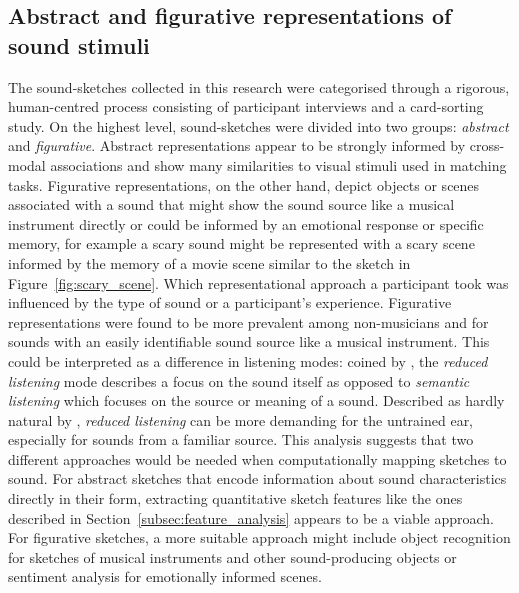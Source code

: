 \documentclass[]{interact}
\theoremstyle{plain}%
\theoremstyle{definition}
\theoremstyle{remark}
\begin{document}
\subsection{Abstract and figurative representations of sound stimuli}\label{subsec:disc_sketch_categorisation}
The sound-sketches collected in this research were categorised through a rigorous, human-centred process consisting of participant interviews and a card-sorting study. On the highest level, sound-sketches were divided into two groups: \textit{abstract} and \textit{figurative}. Abstract representations appear to be strongly informed by cross-modal associations and show many similarities to visual stimuli used in matching tasks. Figurative representations, on the other hand, depict objects or scenes associated with a sound that might show the sound source like a musical instrument directly or could be informed by an emotional response or specific memory, for example a scary sound might be represented with a scary scene informed by the memory of a movie scene similar to the sketch in Figure~\ref{fig:scary_scene}. Which representational approach a participant took was influenced by the type of sound or a participant's experience. Figurative representations were found to be more prevalent among non-musicians and for sounds with an easily identifiable sound source like a musical instrument. This could be interpreted as a difference in listening modes: coined by , the \textit{reduced listening} mode describes a focus on the sound itself as opposed to \textit{semantic listening} which focuses on the source or meaning of a sound. Described as hardly natural by , \textit{reduced listening} can be more demanding for the untrained ear, especially for sounds from a familiar source. This analysis suggests that two different approaches would be needed when computationally mapping sketches to sound. For abstract sketches that encode information about sound characteristics directly in their form, extracting quantitative sketch features like the ones described in Section~\ref{subsec:feature_analysis} appears to be a viable approach. For figurative sketches, a more suitable approach might include object recognition for sketches of musical instruments and other sound-producing objects or sentiment analysis for emotionally informed scenes. 
\\ \\
\end{document}

